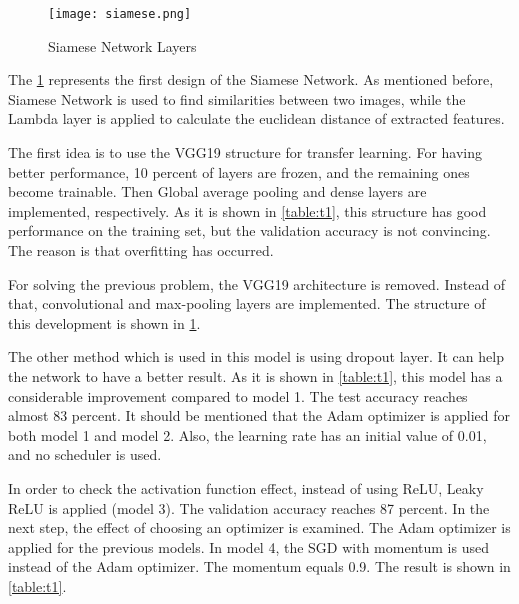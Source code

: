 \begin{figure}[!h]
	\centering
	\texttt{[image: siamese.png]}
	\caption{Siamese Network Layers}
	\label{fig:f3}
\end{figure}

The \ref{fig:f3} represents the first design of the Siamese Network. As mentioned before, Siamese Network is used to find similarities between two images, while the Lambda layer is applied to calculate the euclidean distance of extracted features. 


The first idea is to use the VGG19 structure for transfer learning. For having better performance, 10 percent of layers are frozen, and the remaining ones become trainable. Then Global average pooling and dense layers are implemented, respectively. As it is shown in \ref{table:t1}, this structure has good performance on the training set, but the validation accuracy is not convincing. The reason is that overfitting has occurred.

For solving the previous problem, the VGG19 architecture is removed. Instead of that, convolutional and max-pooling layers are implemented. The structure of this development is shown in \ref{fig:f3}.


The other method which is used in this model is using dropout layer. It can help the network to have a better result. As it is shown in \ref{table:t1}, this model has a considerable improvement compared to model 1. The test accuracy reaches almost 83 percent. 
It should be mentioned that the Adam optimizer is applied for both model 1 and model 2. Also, the learning rate has an initial value of 0.01, and no scheduler is used.

In order to check the activation function effect, instead of using ReLU, Leaky ReLU is applied (model 3). The validation accuracy reaches 87 percent. In the next step, the effect of choosing an optimizer is examined. The Adam optimizer is applied for the previous models. In model 4, the SGD with momentum is used instead of the Adam optimizer. The momentum equals 0.9. The result is shown in \ref{table:t1}.

